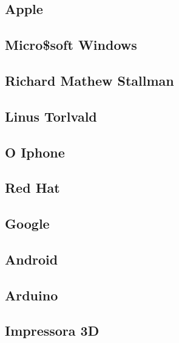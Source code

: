 	\subsection[Apple]{Apple}

	
	\subsection[Micro\$soft Windows]{Micro\$soft Windows}

	
	\subsection[Richard Mathew Stallman]{Richard Mathew Stallman}

	
	\subsection[Linus Torlvald]{Linus Torlvald}

	
	\subsection[O Iphone]{O Iphone}

	
	\subsection[Red Hat]{Red Hat}

	
	\subsection[Google]{Google}

	
	\subsection[Android]{Android}

	
	\subsection[Arduino]{Arduino}

	
	\subsection[Impressora 3D]{Impressora 3D}


